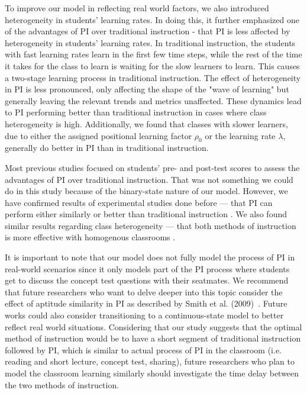 To improve our model in reflecting real world factors, we also introduced heterogeneity in students' learning rates.
In doing this, it further emphasized one of the advantages of PI over traditional instruction - that PI is less affected by heterogeneity in students' learning rates.
In traditional instruction, the students with fast learning rates learn in the first few time steps, while the rest of the time it takes for the class to learn is waiting for the slow learners to learn.
This causes a two-stage learning process in traditional instruction.
The effect of heterogeneity in PI is less pronounced, only affecting the shape of the "wave of learning" but generally leaving the relevant trends and metrics unaffected.
These dynamics lead to PI performing better than traditional instruction in cases where class heterogeneity is high.
Additionally, we found that classes with slower learners, due to either the assigned positional learning factor $\rho_0$ or the learning rate $\lambda$, generally do better in PI than in traditional instruction.

Most previous studies focused on students' pre- and post-test scores to assess the advantages of PI over traditional instruction. 
That was not something we could do in this study because of the binary-state nature of our model.
However, we have confirmed results of experimental studies done before --- that PI can perform either similarly or better than traditional instruction \cite{crouch2001peer,lasry2008peer,thacker1994comparing,smith2009peer}.
We also found similar results regarding class heterogeneity --- that both methods of instruction is more effective with homogenous classrooms \cite{roxas2010seating}.

It is important to note that our model does not fully model the process of PI in real-world scenarios since it only models part of the PI process where students get to discuss the concept test questions with their seatmates.
We recommend that future researchers who want to delve deeper into this topic consider the effect of aptitude similarity in PI as described by Smith et al. (2009)~\cite{smith2009peer}.
Future works could also consider transitioning to a continuous-state model to better reflect real world situations.
Considering that our study suggests that the optimal method of instruction would be to have a short segment of traditional instruction followed by PI, which is similar to actual process of PI in the classroom (i.e. reading and short lecture, concept test, sharing), future researchers who plan to model the classroom learning similarly should investigate the time delay between the two methods of instruction.